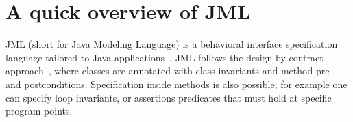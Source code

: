 
\section{A quick overview of JML} \label{prelim}
JML (short for Java Modeling Language) is a behavioral interface specification language tailored to Java applications~\cite{JMLRefMan}. JML 
follows the design-by-contract approach~\cite{M97oos}, where classes are annotated with class invariants and method pre- and postconditions. Specification
inside methods is also possible; for example one can specify loop invariants, or assertions  predicates that must hold at specific program points. 

